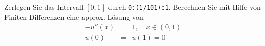 \begin{aufg}[0]
\label{randwert}
Zerlegen Sie das Intervall $[0,1]$ durch 
  \lstinline!0:(1/101):1!. Berechnen Sie mit Hilfe von 
Finiten Differenzen eine approx. Lösung von
{
\begin{eqnarray*}
-u''(x) & = & 1, \quad x \in (0,1)\\
u(0) & = & u(1) =0
\end{eqnarray*}}
\end{aufg}